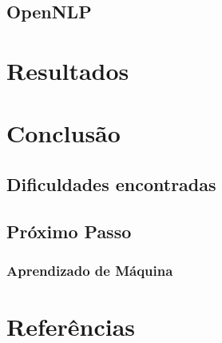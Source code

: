 \documentclass[11pt]{report}
\begin{document}
\section{OpenNLP}

\pagebreak
\chapter{Resultados}

\pagebreak
\chapter{Conclusão}
\section{Dificuldades encontradas}
\section{Próximo Passo}
\subsection{Aprendizado de Máquina}

\pagebreak
\chapter*{Referências}
\end{document}
